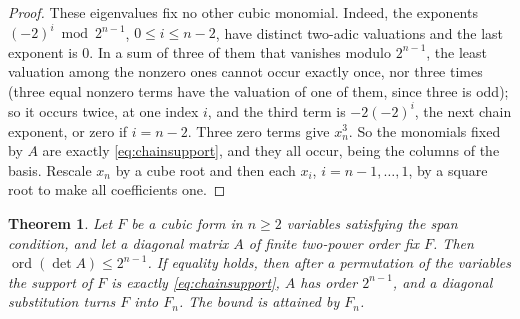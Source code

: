 \documentclass[11pt,a4paper]{article}
\newtheorem{theorem}{Theorem}[section]
\theoremstyle{definition}
\newcommand{\ord}{\operatorname{ord}}
\begin{document}
\begin{proof}
These eigenvalues fix no other cubic monomial. Indeed, the exponents
$(-2)^i\bmod2^{n-1}$, $0\le i\le n-2$, have distinct two-adic valuations and
the last exponent is $0$. In a sum of three of them that vanishes modulo
$2^{n-1}$, the least valuation among the nonzero ones cannot occur exactly
once, nor three times (three equal nonzero terms have the valuation of one of
them, since three is odd); so it occurs twice, at one index $i$, and the third
term is $-2(-2)^i$, the next chain exponent, or zero if $i=n-2$. Three zero
terms give $x_n^3$. So the monomials fixed by $A$ are exactly
\eqref{eq:chainsupport}, and they all occur, being the columns of the basis.
Rescale $x_n$ by a cube root and then each $x_i$, $i=n-1,\dots,1$, by a square
root to make all coefficients one.
\end{proof}

\begin{theorem}\label{thm:fullcubicsupport}
Let $F$ be a cubic form in $n\ge2$ variables satisfying the span condition, and
let a diagonal matrix $A$ of finite two-power order fix $F$. Then
$\ord(\det A)\le2^{n-1}$. If equality holds, then after a permutation of the
variables the support of $F$ is exactly \eqref{eq:chainsupport}, $A$ has order
$2^{n-1}$, and a diagonal substitution turns $F$ into $F_n$. The bound is
attained by $F_n$.
\end{theorem}
\end{document}
